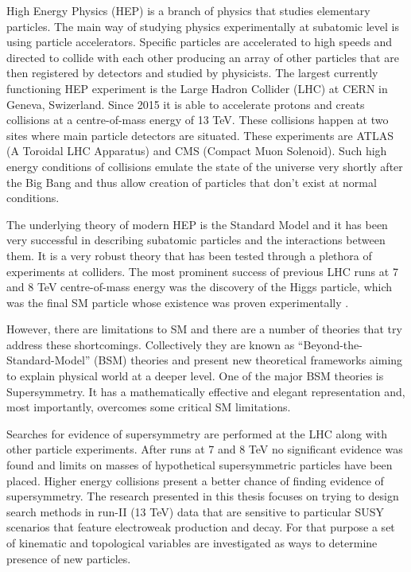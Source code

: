 High Energy Physics (HEP) is a branch of physics that studies elementary particles. The main way of studying physics experimentally at subatomic level is using particle accelerators. Specific particles are accelerated to high speeds and directed to collide with each other producing an array of other particles that are then registered by detectors and studied by physicists. The largest currently functioning HEP experiment is the Large Hadron Collider (LHC) at CERN in Geneva, Swizerland. Since 2015 it is able to accelerate protons and creats collisions at a centre-of-mass energy of 13 TeV. These collisions happen at two sites where main particle detectors are situated. These experiments are ATLAS (A Toroidal LHC Apparatus) and CMS (Compact Muon Solenoid). Such high energy conditions of collisions emulate the state of the universe very shortly after the Big Bang and thus allow creation of particles that don't exist at normal conditions. 

The underlying theory of modern HEP is the Standard Model and it has been very successful in describing subatomic particles and the interactions between them. It is a very robust theory that has been tested through a plethora of experiments at colliders. The most prominent success of previous LHC runs at 7 and 8 TeV centre-of-mass energy was the discovery of the Higgs particle, which 
was the final SM particle whose existence was proven experimentally \citep{Aad:2012tfa,chatrchyan2012observation}.   

However, there are limitations to SM and there are a number of theories that try address these shortcomings. Collectively they are known as “Beyond-the-Standard-Model” (BSM) theories and present new theoretical frameworks aiming to explain physical world at a deeper level. One of the major BSM theories is Supersymmetry. It has a mathematically effective and elegant representation and, most importantly, overcomes some critical SM limitations.

Searches for evidence of supersymmetry are performed at the LHC along with other particle experiments. After runs at 7 and 8 TeV no significant evidence was found and limits on masses of hypothetical supersymmetric particles have been placed. Higher energy collisions present a better chance of finding  evidence of supersymmetry. The research presented in this thesis focuses on trying to design search methods in run-II (13 TeV) data that are sensitive to particular SUSY scenarios that feature electroweak production and decay. For that purpose a set of kinematic and topological variables are investigated as ways to determine presence of new particles.
